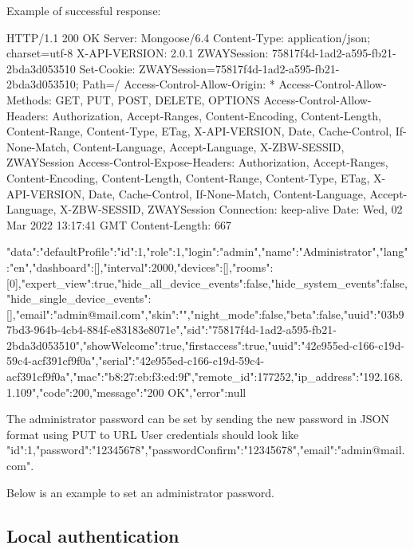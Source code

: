 Example of successful response:
\begin{listingverbatim}
HTTP/1.1 200 OK
Server: Mongoose/6.4
Content-Type: application/json; charset=utf-8
X-API-VERSION: 2.0.1
ZWAYSession: 75817f4d-1ad2-a595-fb21-2bda3d053510
Set-Cookie: ZWAYSession=75817f4d-1ad2-a595-fb21-2bda3d053510; Path=/
Access-Control-Allow-Origin: *
Access-Control-Allow-Methods: GET, PUT, POST, DELETE, OPTIONS
Access-Control-Allow-Headers: Authorization, Accept-Ranges, Content-Encoding, Content-Length, Content-Range, Content-Type, ETag, X-API-VERSION, Date, Cache-Control, If-None-Match, Content-Language, Accept-Language, X-ZBW-SESSID, ZWAYSession
Access-Control-Expose-Headers: Authorization, Accept-Ranges, Content-Encoding, Content-Length, Content-Range, Content-Type, ETag, X-API-VERSION, Date, Cache-Control, If-None-Match, Content-Language, Accept-Language, X-ZBW-SESSID, ZWAYSession
Connection: keep-alive
Date: Wed, 02 Mar 2022 13:17:41 GMT
Content-Length: 667

{"data":{"defaultProfile":{"id":1,"role":1,"login":"admin","name":"Administrator","lang":"en","dashboard":[],"interval":2000,"devices":[],"rooms":[0],"expert_view":true,"hide_all_device_events":false,"hide_system_events":false,"hide_single_device_events":[],"email":"admin@mail.com","skin":"","night_mode":false,"beta":false,"uuid":"03b97bd3-964b-4cb4-884f-e83183e8071e","sid":"75817f4d-1ad2-a595-fb21-2bda3d053510","showWelcome":true},"firstaccess":true,"uuid":"42e955ed-c166-c19d-59c4-acf391cf9f0a","serial":"42e955ed-c166-c19d-59c4-acf391cf9f0a","mac":"b8:27:eb:f3:ed:9f","remote_id":177252,"ip_address":"192.168.1.109"},"code":200,"message":"200 OK","error":null}
\end{listingverbatim}

The administrator password can be set by sending the new password in JSON format using PUT to URL 
User credentials should look like {"id":1,"password":"12345678","passwordConfirm":"12345678","email":"admin@mail.com"}.

Below is an example to set an administrator password.
{\scriptsize
\begin{quote} 
\end{quote}
}

\subsection{Local authentication}
\label{cap:authentication_local}

